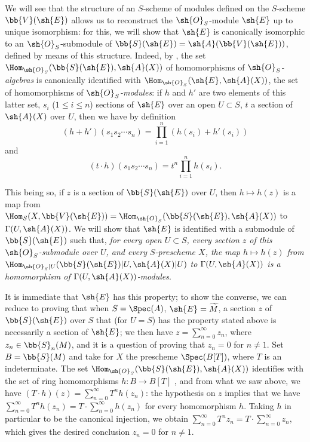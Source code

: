 \begin{env}[1.7.14]
\label{II.1.7.14}
We will see that the structure of an $S$-scheme of modules defined on the $S$-scheme $\bb{V}(\sh{E})$ allows us to reconstruct the $\sh{O}_S$-module $\sh{E}$ up to unique isomorphism: for this, we will show that $\sh{E}$ is canonically isomorphic to an $\sh{O}_S$-submodule of $\bb{S}(\sh{E})=\sh{A}(\bb{V}(\sh{E}))$, defined by means of this structure.
Indeed, by , the set $\Hom_{\sh{O}_S}(\bb{S}(\sh{E}),\sh{A}(X))$ of homomorphisms of \emph{$\sh{O}_S$-algebras} is canonically identified with $\Hom_{\sh{O}_S}(\sh{E},\sh{A}(X))$, the set of homomorphisms of \emph{$\sh{O}_S$-modules}: if $h$ and $h'$ are two elements of this latter set, $s_i$ ($1\leq i\leq n$) sections of $\sh{E}$ over an open $U\subset S$, $t$ a section of $\sh{A}(X)$ over $U$, then we have by definition
\[
  (h+h')(s_1 s_2\cdots s_n)=\prod_{i=1}^n(h(s_i)+h'(s_i))
\]
and
\[
  (t\cdot h)(s_1 s_2\cdots s_n)=t^n\prod_{i=1}^n h(s_i).
\]

This being so, if $z$ is a section of $\bb{S}(\sh{E})$ over $U$, then $h\mapsto h(z)$ is a map from $\Hom_S(X,\bb{V}(\sh{E}))=\Hom_{\sh{O}_S}(\bb{S}(\sh{E}),\sh{A}(X))$ to $\Gamma(U,\sh{A}(X))$.
We will
show that $\sh{E}$ is identified with a submodule of $\bb{S}(\sh{E})$ such that, \emph{for every open $U\subset S$, every section $z$ of this $\sh{O}_S$-submodule over $U$, and every $S$-prescheme $X$, the map $h\mapsto h(z)$ from $\Hom_{\sh{O}_S|U}(\bb{S}(\sh{E})|U,\sh{A}(X)|U)$ to $\Gamma(U,\sh{A}(X))$ is a homomorphism of $\Gamma(U,\sh{A}(X))$-modules}.

It is immediate that $\sh{E}$ has this property; to show the converse, we can reduce to proving that when $S=\Spec(A)$, $\sh{E}=\widetilde{M}$, a section $z$ of $\bb{S}(\sh{E})$ over $S$ that (for $U=S$) has the property stated above is necessarily a section of $\sh{E}$; we then have $z=\sum_{n=0}^\infty z_n$, where $z_n\in\bb{S}_n(M)$, and it is a question of proving that $z_n=0$ for $n\neq 1$.
Set $B=\bb{S}(M)$ and take for $X$ the prescheme $\Spec(B[T])$, where $T$ is an indeterminate.
The set $\Hom_{\sh{O}_S}(\bb{S}(\sh{E}),\sh{A}(X))$ identifies with the set of ring homomorphisms $h:B\to B[T]$ , and from what we saw above, we have $(T\cdot h)(z)=\sum_{n=0}^\infty T^n h(z_n)$: the hypothesis on $z$ implies that we have $\sum_{n=0}^\infty T^n h(z_n)=T\cdot\sum_{n=0}^\infty h(z_n)$ for every homomorphism $h$.
Taking $h$ in particular to be the canonical injection, we obtain $\sum_{n=0}^\infty T^n z_n=T\cdot\sum_{n=0}^\infty z_n$, which gives the desired conclusion $z_n=0$ for $n\neq 1$.
\end{env}

